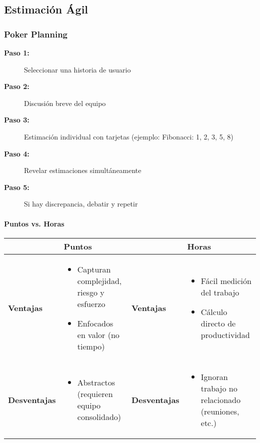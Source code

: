 \subsection{Estimación Ágil}
\label{subsec:agil}

\subsubsection{Poker Planning}
\label{subsubsec:poker}

\begin{description}
    \item[\textbf{Paso 1:}] Seleccionar una historia de usuario
    \item[\textbf{Paso 2:}] Discusión breve del equipo
    \item[\textbf{Paso 3:}] Estimación individual con tarjetas (ejemplo: Fibonacci: 1, 2, 3, 5, 8)
    \item[\textbf{Paso 4:}] Revelar estimaciones simultáneamente
    \item[\textbf{Paso 5:}] Si hay discrepancia, debatir y repetir
\end{description}

\paragraph{Puntos vs. Horas}
\label{par:puntos-vs-horas}

\begin{center}
    \begin{tabularx}{\textwidth}{lXlX}
        \toprule
        & \textbf{Puntos} & & \textbf{Horas} \\
        \midrule
        \textbf{Ventajas} &
        \begin{itemize}
            \item Capturan complejidad, riesgo y esfuerzo
            \item Enfocados en valor (no tiempo)
        \end{itemize} &
        \textbf{Ventajas} &
        \begin{itemize}[leftmargin=*]
            \item Fácil medición del trabajo
            \item Cálculo directo de productividad
        \end{itemize} \\
        \midrule
        \textbf{Desventajas} &
        \begin{itemize}[leftmargin=*]
            \item Abstractos (requieren equipo consolidado)
        \end{itemize} &
        \textbf{Desventajas} &
        \begin{itemize}[leftmargin=*]
            \item Ignoran trabajo no relacionado (reuniones, etc.)
        \end{itemize} \\
        \bottomrule
    \end{tabularx}
\end{center}
